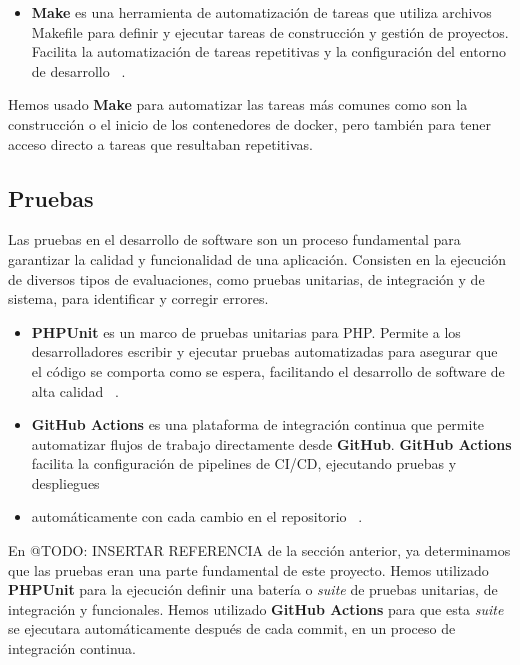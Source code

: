\begin{itemize}
    \item \textbf{Make}
    es una herramienta de automatización de tareas que utiliza archivos Makefile para definir y ejecutar tareas de
    construcción y gestión de proyectos.
    Facilita la automatización de tareas repetitivas y la configuración del entorno de desarrollo
    ~\cite{https://www.gnu.org/software/make/manual/}.
\end{itemize}

Hemos usado \textbf{Make} para automatizar las tareas más comunes como son la construcción o el inicio de los
contenedores de docker, pero también para tener acceso directo a tareas que resultaban repetitivas.

\subsection*{Pruebas}

Las pruebas en el desarrollo de software son un proceso fundamental para garantizar la calidad y funcionalidad de una
aplicación.
Consisten en la ejecución de diversos tipos de evaluaciones, como pruebas unitarias, de integración y de sistema, para
identificar y corregir errores.

\begin{itemize}
    \item \textbf{PHPUnit} es un marco de pruebas unitarias para PHP. Permite a los desarrolladores escribir y
    ejecutar pruebas automatizadas para asegurar que el código se comporta como se espera, facilitando el desarrollo de
    software de alta calidad ~\cite{https://phpunit.de/manual/current/en/}.
    \item \textbf{GitHub Actions} es una plataforma de integración continua que permite automatizar flujos de
    trabajo directamente desde \textbf{GitHub}.
    \textbf{GitHub Actions} facilita la configuración de pipelines de CI/CD, ejecutando pruebas y despliegues
    \item automáticamente con cada cambio en el repositorio ~\cite{https://docs.github.com/en/actions}.
\end{itemize}

En \colorbox{color_highlight}{@TODO: INSERTAR REFERENCIA} de la sección anterior, ya determinamos que las pruebas eran
una parte fundamental de este proyecto.
Hemos utilizado \textbf{PHPUnit}  para la ejecución definir una batería o \textit{suite} de pruebas unitarias, de
integración y funcionales.
Hemos utilizado \textbf{GitHub Actions}  para que esta \textit{suite}
se ejecutara automáticamente después de cada commit, en un proceso de integración continua.

